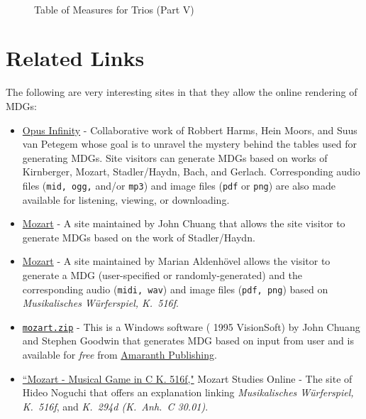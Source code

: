 \documentclass[a4paper,x11names,svgnames,10pt]{article}
\begin{document}
{\newpage
${}_{}$\\
\vspace{0.10in}
\begin{figure}[H]
	\centering
	\def\svgwidth{0.975\columnwidth}
	
	\caption{Table of Measures for Trios (Part V)}
	\label{fig:meas5}
\end{figure}

\newpage
\section{Related Links}
The following are very interesting sites in that they allow the online rendering of MDGs:
\begin{itemize}
	\item \href{https://opus-infinity.org}{Opus Infinity} - Collaborative work of Robbert Harms, Hein Moors, and Suus van Petegem whose goal is to unravel the mystery behind the tables used for generating MDGs.  Site visitors can generate MDGs based on works of Kirnberger, Mozart, Stadler/Haydn, Bach, and Gerlach.  Corresponding audio files ({\tt mid, ogg,} and/or {\tt mp3}) and image files ({\tt pdf} or {\tt png}) are also made available for listening, viewing, or downloading.
	
	\item  \href{http://sunsite.univie.ac.at/Mozart/dice/}{Mozart} - A site maintained by John Chuang that allows the site visitor to generate MDGs based on the work of Stadler/Haydn.
 	
	\item  \href{https://marian-aldenhoevel.de/mozart/}{Mozart} - A site maintained by Marian Aldenh\"{o}vel allows the visitor to generate a MDG (user-specified or randomly-generated) and the corresponding audio ({\tt midi, wav}) and image files ({\tt pdf, png}) based on {\em Musikalisches W\"{u}rferspiel, K.\ 516f}.
 	
 	\item \href{https://www.amaranthpublishing.com/MozartDiceGame.htm}{\tt mozart.zip} -  This is a Windows software ({\small\textcopyright} 1995 VisionSoft) by John Chuang and Stephen Goodwin that generates MDG based on input from user and is available for {\it free} from  \href{http://www.amaranthpublishing.com/MozartDiceGame.htm}{Amaranth Publishing}.  
 	
 	\item \href{(http://www.asahi-net.or.jp/\~rb5h-ngc/e/k516f.htm}{``Mozart - Musical Game in C K. 516f,"}	Mozart Studies Online - The site of Hideo Noguchi that offers an explanation linking {\em Musikalisches W\"{u}rferspiel, K.\ 516f}, and  {\em K.\ 294d (K.\ Anh.\ C 30.01)}. 
\end{itemize}

}
\end{document}
